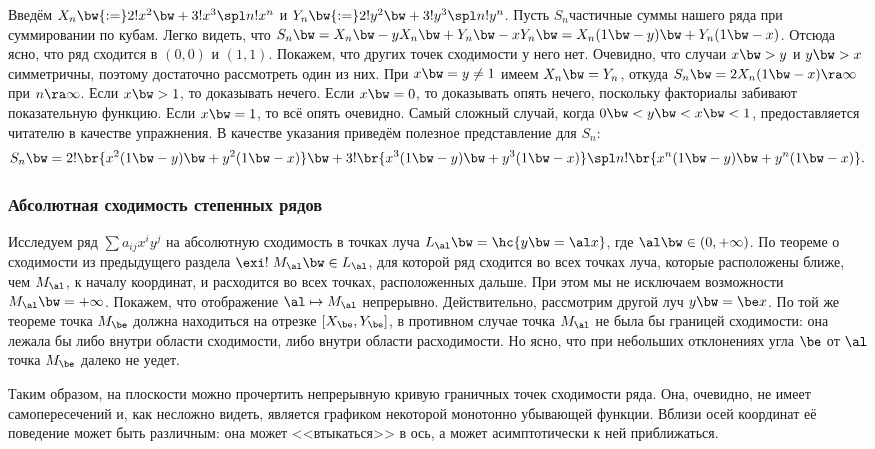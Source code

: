 \documentclass[a4paper]{article}
\newcommand{\elx}[1]{#1!x^{#1}}
\newcommand{\ely}[1]{#1!y^{#1}}
\begin{document}
Введём $X_n \bw{:=} \elx2 \bw+ \elx3\spl \elx n$ и $Y_n \bw{:=} \ely2 \bw+ \ely3\spl \ely n$. Пусть
$S_n$\т частичные суммы нашего ряда при суммировании по кубам. Легко видеть, что $S_n \bw= X_n \bw-
yX_n \bw+ Y_n \bw- xY_n \bw= X_n(1\bw-y) \bw+ Y_n(1\bw-x)$. Отсюда ясно, что ряд сходится в $(0,0)$ и $(1,1)$.
Покажем, что других точек сходимости у него нет. Очевидно, что случаи $x\bw>y$ и $y\bw>x$
симметричны, поэтому достаточно рассмотреть один из них. При $x \bw= y \neq 1$ имеем $X_n \bw= Y_n$,
откуда $S_n \bw= 2X_n(1\bw-x) \ra \infty$ при $n \ra \infty$. Если $x \bw> 1$, то доказывать нечего. Если
$x\bw= 0$, то доказывать опять нечего, поскольку факториалы забивают показательную функцию. Если $x \bw=
1$, то всё опять очевидно. Самый сложный случай, когда $0 \bw< y \bw< x \bw< 1$, предоставляется читателю в
качестве упражнения. В качестве указания приведём полезное представление для $S_n$:
$$
  S_n \bw= 2!\br{x^2(1\bw-y) \bw+ y^2(1\bw-x)} \bw+ 3!\br{x^3(1\bw-y) \bw+ y^3(1\bw-x)}
  \spl n!\br{x^n(1\bw-y) \bw+ y^n(1\bw-x)}.
$$

\subsubsection{Абсолютная сходимость степенных рядов}

\vskip-10pt
\hangindent=-40mm
Исследуем ряд $\sum a_{ij}x^iy^j$ на абсолютную сходимость в точках луча
$L_\al \bw= \hc{y \bw= \al x}$, где $\al \bw\in (0,+\infty)$.
По теореме о сходимости из предыдущего раздела $\exi! \; M_\al \bw\in L_\al$, для которой ряд сходится
во всех точках луча, которые расположены ближе, чем $M_\al$, к началу координат, и расходится во
всех точках, расположенных дальше. При этом мы не исключаем возможности $M_\al \bw= +\infty$. Покажем,
что отображение $\al \mapsto M_\al$ непрерывно. Действительно, рассмотрим другой луч $y \bw= \be x$.
По той же теореме точка $M_\be$ должна находиться на отрезке $[X_\be, Y_\be]$, в противном случае
точка $M_\al$ не была бы границей сходимости: она лежала бы либо внутри области сходимости, либо
внутри области расходимости. Но ясно, что при небольших отклонениях угла $\be$ от $\al$ точка
$M_\be$ далеко не уедет.

Таким образом, на плоскости можно прочертить непрерывную кривую граничных точек сходимости ряда.
Она, очевидно, не имеет самопересечений и, как несложно видеть, является графиком некоторой
монотонно убывающей функции. Вблизи осей координат её поведение может быть различным:
она может <<втыкаться>> в ось, а может асимптотически к ней приближаться.
\end{document}
